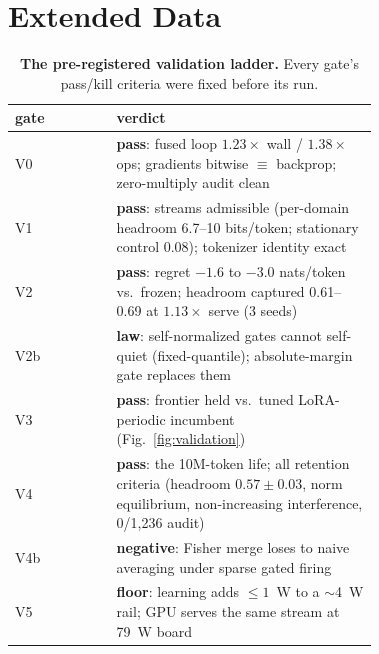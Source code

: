 \documentclass[sn-nature]{sn-jnl}   %
\begin{document}
\clearpage
\section*{Extended Data}
\small
\setcounter{figure}{0}
\setcounter{table}{0}
\captionsetup[figure]{name=Extended Data Fig.}
\captionsetup[table]{name=Extended Data Table}
\vspace{6pt}

\begin{table}[h!]
\centering
\caption{\textbf{The pre-registered validation ladder.} Every gate's pass/kill
criteria were fixed before its run.}
\begin{tabular}{@{}lp{0.72\linewidth}@{}}
\toprule
gate & verdict \\
\midrule
V0 & \textbf{pass}: fused loop $1.23\times$ wall / $1.38\times$ ops; gradients
bitwise $\equiv$ backprop; zero-multiply audit clean \\
V1 & \textbf{pass}: streams admissible (per-domain headroom 6.7--10 bits/token;
stationary control 0.08); tokenizer identity exact \\
V2 & \textbf{pass}: regret $-1.6$ to $-3.0$ nats/token vs.\ frozen; headroom
captured 0.61--0.69 at $1.13\times$ serve (3 seeds) \\
V2b & \textbf{law}: self-normalized gates cannot self-quiet (fixed-quantile);
absolute-margin gate replaces them \\
V3 & \textbf{pass}: frontier held vs.\ tuned LoRA-periodic incumbent
(Fig.~\ref{fig:validation}) \\
V4 & \textbf{pass}: the 10M-token life; all retention criteria (headroom
$0.57\pm0.03$, norm equilibrium, non-increasing interference, 0/1{,}236 audit) \\
V4b & \textbf{negative}: Fisher merge loses to naive averaging under sparse gated
firing \\
V5 & \textbf{floor}: learning adds $\le1$~W to a $\sim$4~W rail; GPU serves the
same stream at 79~W board \\
\bottomrule
\end{tabular}
\label{tab:ladder}
\end{table}
\end{document}
